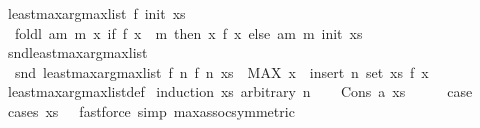 \begin{isabellebody}
\endisatagproof
{\isafoldproof}%
%
\isadelimproof
\isanewline
%
\endisadelimproof
\isanewline
{}\isamarkupfalse%
\ {\isachardoublequoteopen}least{\isacharunderscore}{\kern0pt}max{\isacharunderscore}{\kern0pt}arg{\isacharunderscore}{\kern0pt}max{\isacharunderscore}{\kern0pt}list\ f\ init\ xs\ {\isacharequal}{\kern0pt}\ \isanewline
\ \ foldl\ {\isacharparenleft}{\kern0pt}{\isasymlambda}{\isacharparenleft}{\kern0pt}am{\isacharcomma}{\kern0pt}\ m{\isacharparenright}{\kern0pt}\ x{\isachardot}{\kern0pt}\ if\ f\ x\ {\isachargreater}{\kern0pt}\ m\ then\ {\isacharparenleft}{\kern0pt}x{\isacharcomma}{\kern0pt}\ f\ x{\isacharparenright}{\kern0pt}\ else\ {\isacharparenleft}{\kern0pt}am{\isacharcomma}{\kern0pt}\ m{\isacharparenright}{\kern0pt}{\isacharparenright}{\kern0pt}\ init\ xs{\isachardoublequoteclose}\ \ \isanewline
\isanewline
{}\isamarkupfalse%
\ snd{\isacharunderscore}{\kern0pt}least{\isacharunderscore}{\kern0pt}max{\isacharunderscore}{\kern0pt}arg{\isacharunderscore}{\kern0pt}max{\isacharunderscore}{\kern0pt}list{\isacharcolon}{\kern0pt}\ \isanewline
\ \ {\isachardoublequoteopen}snd\ {\isacharparenleft}{\kern0pt}least{\isacharunderscore}{\kern0pt}max{\isacharunderscore}{\kern0pt}arg{\isacharunderscore}{\kern0pt}max{\isacharunderscore}{\kern0pt}list\ f\ {\isacharparenleft}{\kern0pt}n{\isacharcomma}{\kern0pt}\ f\ n{\isacharparenright}{\kern0pt}\ xs{\isacharparenright}{\kern0pt}\ {\isacharequal}{\kern0pt}\ {\isacharparenleft}{\kern0pt}MAX\ x\ {\isasymin}\ insert\ n\ {\isacharparenleft}{\kern0pt}set\ xs{\isacharparenright}{\kern0pt}{\isachardot}{\kern0pt}\ f\ x{\isacharparenright}{\kern0pt}{\isachardoublequoteclose}\isanewline
%
\isadelimproof
\ \ %
\endisadelimproof
%
\isatagproof
{}\isamarkupfalse%
\ least{\isacharunderscore}{\kern0pt}max{\isacharunderscore}{\kern0pt}arg{\isacharunderscore}{\kern0pt}max{\isacharunderscore}{\kern0pt}list{\isacharunderscore}{\kern0pt}def\isanewline
{}\isamarkupfalse%
\ {\isacharparenleft}{\kern0pt}induction\ xs\ arbitrary{\isacharcolon}{\kern0pt}\ n{\isacharparenright}{\kern0pt}\isanewline
\ \ \isamarkupfalse%
\ {\isacharparenleft}{\kern0pt}Cons\ a\ xs{\isacharparenright}{\kern0pt}\isanewline
\ \ \isamarkupfalse%
\ \isamarkupfalse%
\ {\isacharquery}{\kern0pt}case\isanewline
\ \ \ \ \isamarkupfalse%
\ {\isacharparenleft}{\kern0pt}cases\ {\isachardoublequoteopen}xs\ {\isacharequal}{\kern0pt}\ {\isacharbrackleft}{\kern0pt}{\isacharbrackright}{\kern0pt}{\isachardoublequoteclose}{\isacharparenright}{\kern0pt}\ {\isacharparenleft}{\kern0pt}fastforce\ simp{\isacharcolon}{\kern0pt}\ max{\isachardot}{\kern0pt}assoc{\isacharbrackleft}{\kern0pt}symmetric{\isacharbrackright}{\kern0pt}{\isacharparenright}{\kern0pt}{\isacharplus}{\kern0pt}\isanewline

\end{isabellebody}
